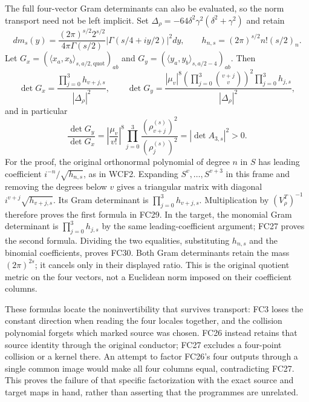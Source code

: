 \documentclass[11pt]{article}
\begin{document}
The full four-vector Gram determinants can also be evaluated, so the
norm transport need not be left implicit. Set
$\Delta_\rho=-64\delta^2\gamma^2(\delta^2+\gamma^2)$ and retain
\[
 dm_s(y)=\frac{(2\pi)^{s/2}2^{s/2}}{4\pi\Gamma(s/2)}
 |\Gamma(s/4+iy/2)|^2dy,\qquad
 h_{n,s}=(2\pi)^{s/2}n!(s/2)_n.
 \tag{FC28}
\]
Let $G_x=(\langle x_a,x_b\rangle_{s,a/2,\mathrm{quot}})_{ab}$
and $G_y=(\langle y_a,y_b\rangle_{s,a/2-4})_{ab}$. Then
\[
 \det G_x=\frac{\prod_{j=0}^3 h_{v+j,s}}{|\Delta_\rho|^2},\qquad
 \det G_y=\frac{|\mu_v|^8
       \left(\prod_{j=0}^3\binom{v+j}{v}\right)^2
       \prod_{j=0}^3h_{j,s}}{|\Delta_\rho|^2},
 \tag{FC29}
\]
and in particular
\[
 \frac{\det G_y}{\det G_x}
 =\left|\frac{\mu_v}{v!}\right|^8
       \prod_{j=0}^3\frac{(\rho_{v+j}^{(s)})^2}
                              {(\rho_j^{(s)})^2}
 =|\det A_{3,s}|^2>0.
 \tag{FC30}
\]
For the proof, the original orthonormal polynomial of degree $n$ in
$S$ has leading coefficient $i^{-n}/\sqrt{h_{n,s}}$, as in WCF2.
Expanding $S^v,\ldots,S^{v+3}$ in this frame and removing the
degrees below $v$ gives a triangular matrix with diagonal
$i^{v+j}\sqrt{h_{v+j,s}}$. Its Gram determinant is
$\prod_{j=0}^3h_{v+j,s}$. Multiplication by $(V_\rho^T)^{-1}$
therefore proves the first formula in FC29. In the target, the
monomial Gram determinant is $\prod_{j=0}^3h_{j,s}$ by the same
leading-coefficient argument; FC27 proves the second formula.
Dividing the two equalities, substituting $h_{n,s}$ and the binomial
coefficients, proves FC30. Both Gram determinants retain the mass
$(2\pi)^{2s}$; it cancels only in their displayed ratio. This is the
original quotient metric on the four vectors, not a Euclidean norm
imposed on their coefficient columns.

These formulas locate the noninvertibility that survives transport:
FC3 loses the constant direction when reading the four locales together,
and the collision polynomial forgets which marked source was chosen.
FC26 instead retains that source identity through the original
conductor; FC27 excludes a four-point collision or a kernel there.
An attempt to factor FC26's four outputs through a single common image
would make all four columns equal, contradicting FC27. This proves the
failure of that specific factorization with the exact source and target
maps in hand, rather than asserting that the programmes are unrelated.
\end{document}
